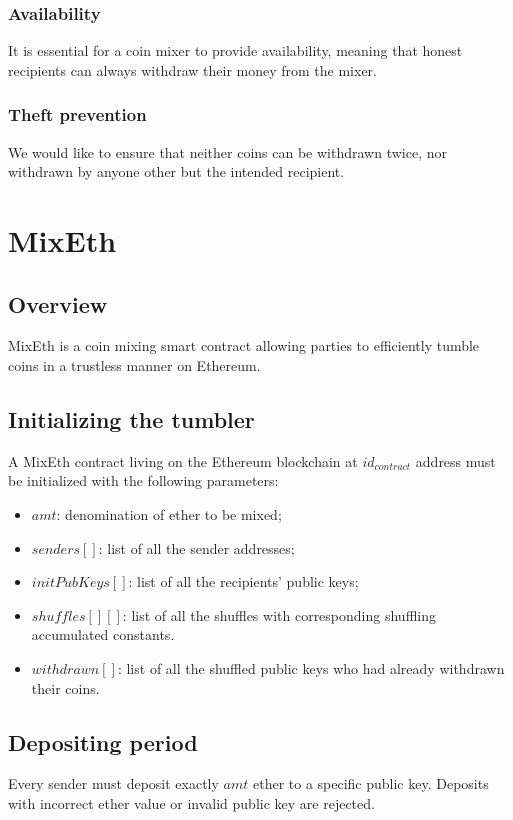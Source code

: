 \documentclass[a4paper]{article}
\theoremstyle{definition}
\begin{document}
\subsubsection{Availability}
It is essential for a coin mixer to provide availability, meaning that honest recipients can always withdraw their money from the mixer.


\subsubsection{Theft prevention}
We would like to ensure that neither coins can be withdrawn twice, nor withdrawn by anyone other but the intended recipient. 
\section{MixEth}

\subsection{Overview}
MixEth is a coin mixing smart contract allowing parties to efficiently tumble coins in a trustless manner on Ethereum.
\subsection{Initializing the tumbler}

A MixEth contract living on the Ethereum blockchain at $id_{contract}$ address must be initialized with the following parameters:
\begin{itemize}
	\item $amt$: denomination of ether to be mixed;
	\item $senders[]$: list of all the sender addresses;
	\item $initPubKeys[]$: list of all the recipients' public keys;
	\item $shuffles[][]$: list of all the shuffles with corresponding shuffling accumulated constants.
	\item $withdrawn[]$: list of all the shuffled public keys who had already withdrawn their coins.	
\end{itemize}

\subsection{Depositing period}
Every sender must deposit exactly $amt$ ether to a specific public key. Deposits with incorrect ether value or invalid public key are rejected.  
\end{document}
